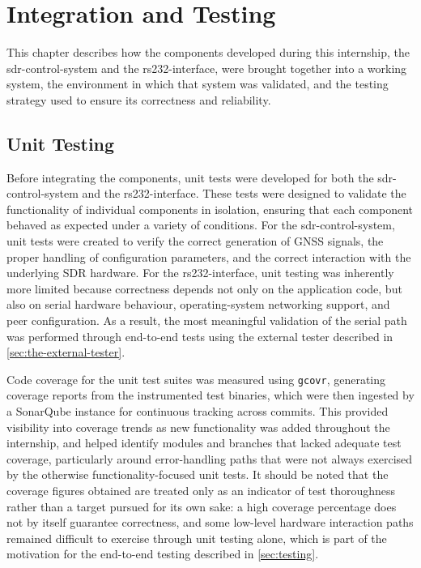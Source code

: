 %
\chapter{Integration and Testing}
\label{cha:integration-testing}

This chapter describes how the components developed during this internship, the
\gls{sdr-control-system} and the \gls{rs232-interface}, were brought together
into a working system, the environment in which that system was validated, and
the testing strategy used to ensure its correctness and reliability.
\section{Unit Testing}

Before integrating the components, unit tests were developed for both the
\gls{sdr-control-system} and the \gls{rs232-interface}. These tests were
designed to validate the functionality of individual components in isolation,
ensuring that each component behaved as expected under a variety of conditions.
For the \gls{sdr-control-system}, unit tests were created to verify the correct
generation of \gls{GNSS} signals, the proper handling of configuration
parameters, and the correct interaction with the underlying \gls{SDR} hardware.
For the \gls{rs232-interface}, unit testing was inherently more limited because
correctness depends not only on the application code, but also on serial
hardware behaviour, operating-system networking support, and peer
configuration. As a result, the most meaningful validation of the serial path
was performed through end-to-end tests using the external tester described in
\autoref{sec:the-external-tester}.

Code coverage for the unit test suites was measured using
\texttt{gcovr}, generating coverage reports from the instrumented test
binaries, which were then ingested by a SonarQube instance for
continuous tracking across commits. This provided visibility into
coverage trends as new functionality was added throughout the
internship, and helped identify modules and branches that lacked
adequate test coverage, particularly around error-handling paths that
were not always exercised by the otherwise functionality-focused unit
tests. It should be noted that the coverage figures obtained are
treated only as an indicator of test thoroughness rather than a target
pursued for its own sake: a high coverage percentage does not by
itself guarantee correctness, and some low-level hardware interaction
paths remained difficult to exercise through unit testing alone, which
is part of the motivation for the end-to-end testing described in
\autoref{sec:testing}.

